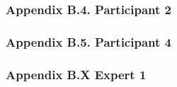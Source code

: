 \documentclass{sigchi}
\begin{document}


\subsubsection{Appendix B.4. Participant 2}



\subsubsection{Appendix B.5. Participant 4}



\subsubsection{Appendix B.X Expert 1}


\end{document}
